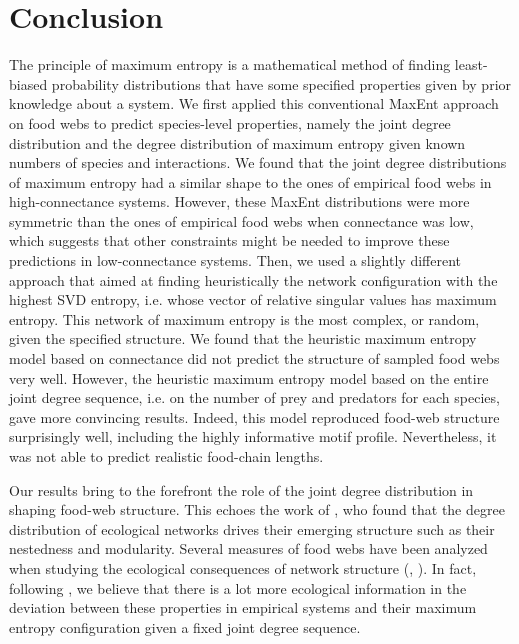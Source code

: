 \section{Conclusion}

The principle of maximum entropy is a mathematical method of finding
least-biased probability distributions that have some specified properties given
by prior knowledge about a system. We first applied this conventional MaxEnt
approach on food webs to predict species-level properties, namely the joint
degree distribution and the degree distribution of maximum entropy given known
numbers of species and interactions. We found that the joint degree
distributions of maximum entropy had a similar shape to the ones of empirical
food webs in high-connectance systems. However, these MaxEnt distributions were
more symmetric than the ones of empirical food webs when connectance was low,
which suggests that other constraints might be needed to improve these
predictions in low-connectance systems. Then, we used a slightly different
approach that aimed at finding heuristically the network configuration with the
highest SVD entropy, i.e. whose vector of relative singular values has maximum
entropy. This network of maximum entropy is the most complex, or random, given
the specified structure. We found that the heuristic maximum entropy model based
on connectance did not predict the structure of sampled food webs very well.
However, the heuristic maximum entropy model based on the entire joint degree
sequence, i.e. on the number of prey and predators for each species, gave more
convincing results. Indeed, this model reproduced food-web structure
surprisingly well, including the highly informative motif profile. Nevertheless,
it was not able to predict realistic food-chain lengths. 

Our results bring to the forefront the role of the joint degree distribution in
shaping food-web structure. This echoes the work of \textcite{Fortuna2010Nestedness},
who found that the degree distribution of ecological networks drives their
emerging structure such as their nestedness and modularity. Several measures of
food webs have been analyzed when studying the ecological consequences of
network structure (\cite{McCann2011Food}, \cite{Delmas2019Analysing}). In fact,
following \textcite{Williams2011Biology}, we believe that there is a lot more
ecological information in the deviation between these properties in empirical
systems and their maximum entropy configuration given a fixed joint degree
sequence.  

